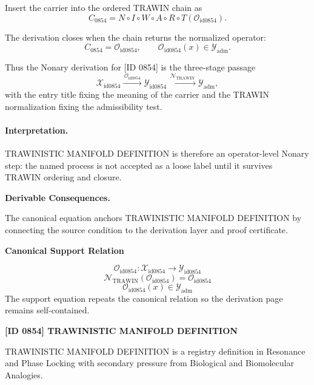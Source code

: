 Insert the carrier into the ordered TRAWIN chain as\[
C_{0854}=N\circ I\circ W\circ A\circ R\circ T(\mathcal{O}_{\mathrm{id0854}}).
\]

The derivation closes when the chain returns the normalized operator:\[
C_{0854}=\mathcal{O}_{\mathrm{id0854}},\qquad \mathcal{O}_{\mathrm{id0854}}(x)\in\mathcal{Y}_{\mathrm{adm}}.
\]

Thus the Nonary derivation for [ID 0854] is the three-stage passage
\[
\mathcal{X}_{\mathrm{id0854}}\xrightarrow{\,\mathcal{O}_{\mathrm{id0854}}\,} \mathcal{Y}_{\mathrm{id0854}}\xrightarrow{\,\mathcal{N}_{\mathrm{TRAWIN}}\,} \mathcal{Y}_{\mathrm{adm}},
\]
with the entry title fixing the meaning of the carrier and the TRAWIN normalization fixing the admissibility test.

\paragraph{Interpretation.} TRAWINISTIC MANIFOLD DEFINITION is therefore an operator-level Nonary step: the named process is not accepted as a loose label until it survives TRAWIN ordering and closure.

\par\vspace{0.35em}
\noindent\textbf{Derivable Consequences.}\quad
\begingroup
\footnotesize
\raggedright
The canonical equation anchors TRAWINISTIC MANIFOLD DEFINITION by connecting the source condition to the derivation layer and proof certificate.
\par\endgroup

\noindent\textbf{Canonical Support Relation}\par
\[
\mathcal{O}_{\mathrm{id0854}}:\mathcal{X}_{\mathrm{id0854}}\longrightarrow\mathcal{Y}_{\mathrm{id0854}}
\]
\[
\mathcal{N}_{\mathrm{TRAWIN}}(\mathcal{O}_{\mathrm{id0854}})=\mathcal{O}_{\mathrm{id0854}}
\]
\[
\mathcal{O}_{\mathrm{id0854}}(x)\in\mathcal{Y}_{\mathrm{adm}}
\]
\noindent The support equation repeats the canonical relation so the derivation page remains self-contained.\par

\clearpage
\noindent\textbf{[ID 0854] TRAWINISTIC MANIFOLD DEFINITION}\par
\vspace{0.35em}
\begingroup\small
{}
TRAWINISTIC MANIFOLD DEFINITION is a registry definition in Resonance and Phase Locking with secondary pressure from Biological and Biomolecular Analogies.

